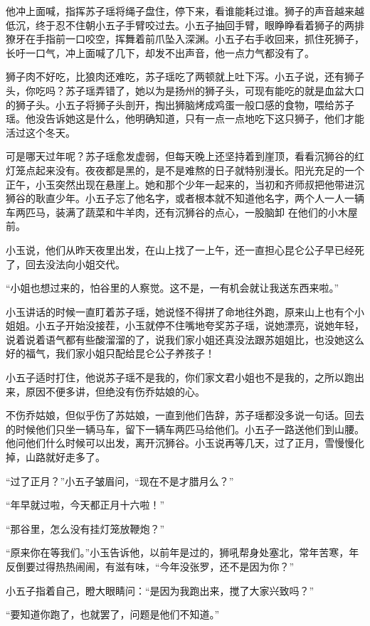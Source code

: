 他冲上面喊，指挥苏子瑶将绳子盘住，停下来，看谁能耗过谁。狮子的声音越来越低沉，终于忍不住朝小五子手臂咬过去。小五子抽回手臂，眼睁睁看着狮子的两排獠牙在手指前一口咬空，挥舞着前爪坠入深渊。小五子右手收回来，抓住死狮子，长吁一口气，冲上面喊了几下，却发不出声音，他一点力气都没有了。

狮子肉不好吃，比狼肉还难吃，苏子瑶吃了两顿就上吐下泻。小五子说，还有狮子头，你吃吗？苏子瑶弄错了，她以为是扬州的狮子头，可现有能吃的就是血盆大口的狮子头。小五子将狮子头剖开，掏出狮脑烤成鸡蛋一般口感的食物，喂给苏子瑶。他没告诉她这是什么，他明确知道，只有一点一点地吃下这只狮子，他们才能活过这个冬天。

可是哪天过年呢？苏子瑶愈发虚弱，但每天晚上还坚持着到崖顶，看看沉狮谷的红灯笼点起来没有。夜夜都是黑的，是不是难熬的日子就特别漫长。阳光充足的一个正午，小玉突然出现在悬崖上。她和那个少年一起来的，当初和齐师叔把他带进沉狮谷的耿直少年。小五子忘了他名字，或者根本就不知道他名字，两个人一人一辆车两匹马，装满了蔬菜和牛羊肉，还有沉狮谷的点心，一股脑卸
在他们的小木屋前。

小玉说，他们从昨天夜里出发，在山上找了一上午，还一直担心昆仑公子早已经死了，回去没法向小姐交代。

“小姐也想过来的，怕谷里的人察觉。这不是，一有机会就让我送东西来啦。”

小玉讲话的时候一直盯着苏子瑶，她说怪不得拼了命地往外跑，原来山上也有个小姐姐。小五子开始没接茬，小玉就停不住嘴地夸奖苏子瑶，说她漂亮，说她年轻，说着说着语气都有些酸溜溜的了，说我们家小姐还真没法跟苏姐姐比，也没她这么好的福气，我们家小姐只配给昆仑公子养孩子！

小五子适时打住，他说苏子瑶不是我的，你们家文君小姐也不是我的，之所以跑出来，原因不便多讲，但绝没有伤乔姑娘的心。

不伤乔姑娘，但似乎伤了苏姑娘，一直到他们告辞，苏子瑶都没多说一句话。回去的时候他们只坐一辆马车，留下一辆车两匹马给他们。小五子一路送他们到山腰。他问他们什么时候可以出发，离开沉狮谷。小玉说再等几天，过了正月，雪慢慢化掉，山路就好走多了。

“过了正月？”小五子皱眉问，“现在不是才腊月么？”

“年早就过啦，今天都正月十六啦！”

“那谷里，怎么没有挂灯笼放鞭炮？”

“原来你在等我们。”小玉告诉他，以前年是过的，狮吼帮身处塞北，常年苦寒，年反倒要过得热热闹闹，有滋有味，“今年没张罗，还不是因为你？”

小五子指着自己，瞪大眼睛问：“是因为我跑出来，搅了大家兴致吗？”

“要知道你跑了，也就罢了，问题是他们不知道。”

